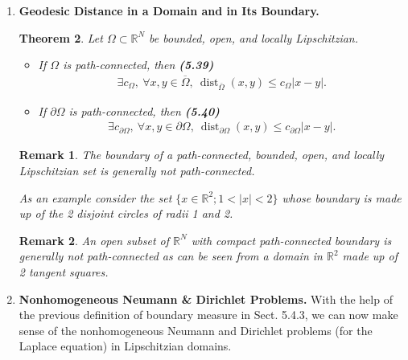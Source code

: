 \documentclass{book}
\numberwithin{equation}{section}
\newtheorem{theorem}{Theorem}[section]
\newtheorem{remark}{Remark}[section]
\begin{document}
\begin{enumerate}
\begin{enumerate}
\begin{theorem}
            If, in addition, $\partial\Omega$ is compact, then \textbf{(5.38)}
            \begin{align*}
                H_{N - 1}\left(\partial\Omega\right) < \infty.
            \end{align*}
        \end{theorem}
        \item \textbf{Geodesic Distance in a Domain and in Its Boundary.}
        
        \begin{theorem}
            Let $\Omega\subset\mathbb{R}^N$ be bounded, open, and locally Lipschitzian.
            \begin{itemize}
                \item[(i)] If $\Omega$ is path-connected, then \textbf{(5.39)}
                \begin{align*}
                    \exists c_\Omega,\ \forall x,y\in\overline{\Omega},\ \operatorname{dist}_{\overline{\Omega}}(x,y)\le c_\Omega\left|x - y\right|.
                \end{align*}
                \item[(ii)] If $\partial\Omega$ is path-connected, then \textbf{(5.40)}
                \begin{align*}
                    \exists c_{\partial\Omega},\ \forall x,y\in\partial\Omega,\ \operatorname{dist}_{\partial\Omega}(x,y)\le c_{\partial\Omega}\left|x - y\right|.
                \end{align*}
            \end{itemize}
        \end{theorem}
        
        \begin{remark}
            The boundary of a path-connected, bounded, open, and locally Lipschitzian set is generally not path-connected.
            
            As an example consider the set $\{x\in\mathbb{R}^2;1 < |x| < 2\}$ whose boundary is made up of the 2 disjoint circles of radii 1 and 2.
        \end{remark}
    
        \begin{remark}
            An open subset of $\mathbb{R}^N$ with compact path-connected boundary is generally not path-connected as can be seen from a domain in $\mathbb{R}^2$ made up of 2 tangent squares.
        \end{remark}
        \item \textbf{Nonhomogeneous Neumann \& Dirichlet Problems.} With the help of the previous definition of boundary measure in Sect. 5.4.3, we can now make sense of the nonhomogeneous Neumann and Dirichlet problems (for the Laplace equation) in Lipschitzian domains.
        

\end{enumerate}
\end{enumerate}
\end{document}
